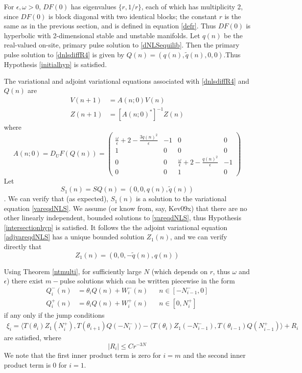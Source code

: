 \documentclass[12pt]{article}
\begin{document}
For $\epsilon, \omega > 0$, $DF(0)$ has eigenvalues $\{r, 1/r\}$, each of which has multiplicity 2, since $DF(0)$ is block diagonal with two identical blocks; the constant $r$ is the same as in the previous section, and is defined in equation \eqref{defr}. Thus $DF(0)$ is hyperbolic with 2-dimensional stable and unstable manifolds. Let $q(n)$ be the real-valued on-site, primary pulse solution to \eqref{dNLSequilib}. Then the primary pulse solution to \eqref{dnlsdiffR4} is given by $Q(n) = (q(n), \tilde{q}(n), 0, 0)$.Thus Hypothesis \ref{initialhyp} is satisfied.

The variational and adjoint variational equations associated with \eqref{dnlsdiffR4} and $Q(n)$ are
\begin{align}
V(n+1) &= A(n; 0) V(n) \label{vareqdNLS} \\
Z(n+1) &= [A(n; 0)^*]^{-1} Z(n) \label{adjvareqdNLS}
\end{align}
where
\begin{equation}\label{AQdNLS}
A(n; 0) = D_U F(Q(n)) = 
\begin{pmatrix}
\frac{\omega}{\epsilon} + 2 - \frac{3 q(n)^2}{\epsilon} & -1 & 0 & 0 \\
1 & 0 & 0 & 0 \\
0 & 0 & \frac{\omega}{\epsilon} + 2 - \frac{q(n)^2}{\epsilon} & -1 \\
0 & 0 & 1 & 0
\end{pmatrix}
\end{equation}
Let 
\begin{equation}\label{defS1}
S_1(n) = S Q(n) = (0, 0, q(n), \tilde{q}(n))
\end{equation}. 
We can verify that (as expected), $S_1(n)$ is a solution to the variational equation \eqref{vareqdNLS}. We assume (or know from, say, Kev09x) that there are no other linearly independent, bounded solutions to \eqref{vareqdNLS}, thus Hypothesis \ref{intersectionhyp} is satisfied. It follows the the adjoint variational equation \eqref{adjvareqdNLS} has a unique bounded solution $Z_1(n)$, and we can verify directly that
\begin{equation}\label{defZ1}
Z_1(n) = (0, 0, -\tilde{q}(n), q(n))
\end{equation}

Using Theorem \ref{ntmulti}, for sufficiently large $N$ (which depends on $r$, thus $\omega$ and $\epsilon$) there exist $m-$pulse solutions which can be written piecewise in the form  
\begin{align*}
Q_i^-(n) &= \theta_i Q(n) + W_i^-(n) && n \in [-N_{i-1}^-, 0] \\
Q_i^+(n) &= \theta_i Q(n) + W_i^+(n) && n \in [0, N_i^+]
\end{align*}
if any only if the jump conditions
\begin{align*}
\xi_i = \langle T(\theta_i) Z_1(N_i^+), T(\theta_{i+1}) Q(-N_i^-) \rangle
- \langle T(\theta_i) Z_1(-N_{i-1}^-), T(\theta_{i-1}) Q(N_{i-1}^+) \rangle + R_i
\end{align*}
are satisfied, where
\[
|R_i| \leq C r^{-3N}
\]
We note that the first inner product term is zero for $i = m$ and the second inner product term is 0 for $i = 1$.
\end{document}
